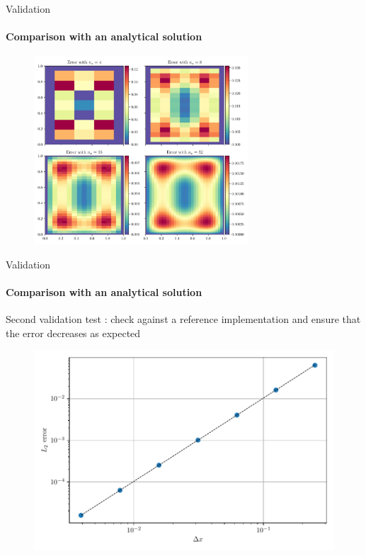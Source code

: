 \documentclass[aspectratio=169]{beamer}
\begin{document}
\begin{frame}{Validation}
    \framesubtitle{Comparison with an analytical solution}
    \begin{figure}
        \centering
        \includegraphics[height=7cm]{Figures/plotconverge.pdf}
    \end{figure}
\end{frame}


\begin{frame}{Validation}
    \framesubtitle{Comparison with an analytical solution}
    Second validation test : check against a reference implementation and ensure that the error decreases as expected

    \begin{figure}
        \centering
        \includegraphics[width=0.6\linewidth]{Figures/Convergence.pdf}
    \end{figure}
\end{frame}

\end{document}
